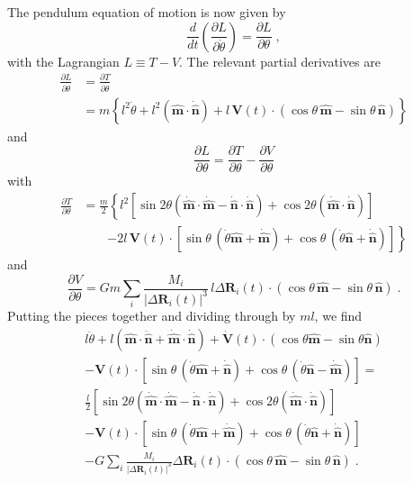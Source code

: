\documentclass[12pt]{article}
\providecommand{\vecsymbol}[1]{\ensuremath{\boldsymbol{#1}}}
\providecommand{\Rv}{\vecsymbol{R}}
\providecommand{\Vv}{\vecsymbol{V}}
\providecommand{\mv}{\hat{\vecsymbol{m}}}
\providecommand{\nv}{\hat{\vecsymbol{n}}}
\providecommand{\thdot}{\dot{\theta}}
\providecommand{\thddot}{\ddot{\theta}}
\begin{document}
The pendulum equation of motion is now given by
\begin{equation}
\frac{d}{dt} \left( \frac{\partial L}{\partial \thdot} \right) =
\frac{\partial L}{\partial \theta} \; ,
\end{equation}
with the Lagrangian $L \equiv T - V$. The relevant partial derivatives are
\begin{equation}
\begin{split}
\frac{\partial L}{\partial \thdot}
&= \frac{\partial T}{\partial \thdot} \\
&= m \left\{ l^2\thdot  + l^2 (\mv\cdot\dot{\nv})
+ l\,\Vv(t)\cdot\left( \cos\theta\,\mv - \sin\theta\,\nv\right) \right\}
\end{split}
\end{equation}
and
\begin{equation}
\frac{\partial L}{\partial \theta} = \frac{\partial T}{\partial \theta} - \frac{\partial V}{\partial \theta}
\end{equation}
with
\begin{equation}
\begin{split}
\frac{\partial T}{\partial \theta} &= \frac{m}{2} \left\{
l^2 \left[ \sin 2\theta \left( \dot{\mv}\cdot\dot{\mv} - \dot{\nv}\cdot\dot{\nv}\right) +
\cos 2\theta \left(\dot{\mv}\cdot\dot{\nv}\right) \right] \right. \\
&\qquad \left. -2 l\,\Vv(t)\cdot\left[ \sin\theta\,(\thdot \mv+\dot{\mv}) +
\cos\theta\,(\thdot \nv+\dot{\nv})\right]
\right\}
\end{split}
\end{equation}
and
\begin{equation}
\frac{\partial V}{\partial \theta} = G m 
\sum_i \frac{M_i}{\left|\Delta\Rv_i(t)\right|^3} \,l \Delta\Rv_i(t)\cdot(\cos\theta\, \mv - \sin\theta\, \nv) \; .
\end{equation}
Putting the pieces together and dividing through by $m l$, we find
\begin{multline}
l\thddot + l(\mv\cdot\ddot{\nv} + \dot{\mv}\cdot\dot{\nv}) +
\dot{\Vv}(t)\cdot\left(\cos\theta \mv - \sin\theta \nv\right) \\
- \Vv(t)\cdot \left[ \sin\theta\, (\thdot\mv+\dot{\nv}) + \cos\theta\, (\thdot\nv - \dot{\mv}) \right] =\\
\frac{l}{2} \left[ \sin 2\theta \left( \dot{\mv}\cdot\dot{\mv} - \dot{\nv}\cdot\dot{\nv}\right) +
\cos 2\theta \left(\dot{\mv}\cdot\dot{\nv}\right) \right]\\
-\Vv(t)\cdot\left[ \sin\theta\,(\thdot \mv+\dot{\mv}) +
\cos\theta\,(\thdot \nv+\dot{\nv})\right]\\
-G \sum_i \frac{M_i}{\left|\Delta\Rv_i(t)\right|^3} \Delta\Rv_i(t)\cdot(\cos\theta\, \mv - \sin\theta\, \nv) \; .
\end{multline}
\end{document}
